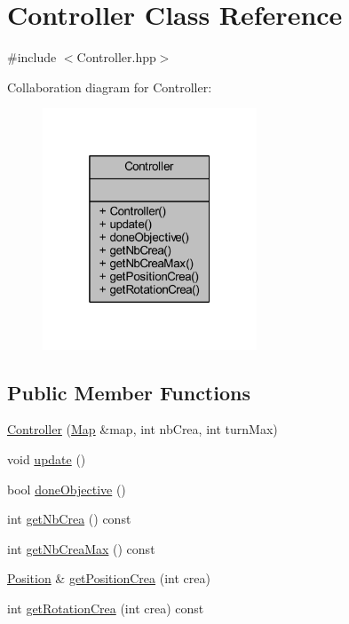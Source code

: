 \hypertarget{class_controller}{}\section{Controller Class Reference}
\label{class_controller}


{\ttfamily \#include $<$Controller.\+hpp$>$}



Collaboration diagram for Controller\+:\nopagebreak
\begin{figure}[H]
\begin{center}
\leavevmode
\includegraphics[width=181pt]{class_controller__coll__graph}
\end{center}
\end{figure}
\subsection*{Public Member Functions}
\begin{DoxyCompactItemize}
\item 
\hyperlink{class_controller_a727b5fc5633083dd6fc09b6331a56446}{Controller} (\hyperlink{class_map}{Map} \&map, int nb\+Crea, int turn\+Max)
\item 
void \hyperlink{class_controller_a7d04c17913f04f99429aa29fa8505484}{update} ()
\item 
bool \hyperlink{class_controller_a716433170fe95a627ae94c1f4e7568db}{done\+Objective} ()
\item 
int \hyperlink{class_controller_a1cf0f3e6f1a6c994b259ce948ea87b53}{get\+Nb\+Crea} () const 
\item 
int \hyperlink{class_controller_aeb69f702f5f8214f838f8b211e2c920c}{get\+Nb\+Crea\+Max} () const 
\item 
\hyperlink{class_position}{Position} \& \hyperlink{class_controller_a8d535e7c32a8c6460be2d8bcc27bb176}{get\+Position\+Crea} (int crea)
\item 
int \hyperlink{class_controller_a263ccb8a81f0600791cf972cedaedd98}{get\+Rotation\+Crea} (int crea) const 
\end{DoxyCompactItemize}


